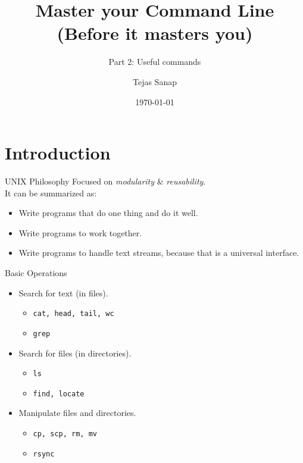 \documentclass[11pt]{beamer}
\title[PLUG Meetup]{Master your Command Line \\ \small{(Before it masters you)} }
\subtitle{\large{Part 2: Useful commands}}
\author{Tejas Sanap}
\date{\today}
\begin{document}
	\begin{frame}
		\titlepage
	\end{frame}
	\begin{frame}
		\tableofcontents
	\end{frame}

	\section{Introduction}
		\begin{frame}{UNIX Philosophy}
			Focused on \emph{modularity} \& \emph{reusability}. \\
			It can be summarized as:
			\begin{itemize}
				\item Write programs that do one thing and do it well.
				\item Write programs to work together.
				\item Write programs to handle text streams, because that is a universal interface.
			\end{itemize}
		\end{frame}

		\begin{frame}{Basic Operations}
			\begin{itemize}
				\item Search for text (in files).
					\begin{itemize}
						\item \texttt{cat, head, tail, wc}
						\item \texttt{grep}
					\end{itemize}
				\item Search for files (in directories).
					\begin{itemize}
						\item \texttt{ls}
						\item \texttt{find, locate}
					\end{itemize}
				\item Manipulate files and directories.
					\begin{itemize}
						\item \texttt{cp, scp, rm, mv}
						\item \texttt{rsync}
					\end{itemize}
			\end{itemize}			
		\end{frame}
\end{document}

